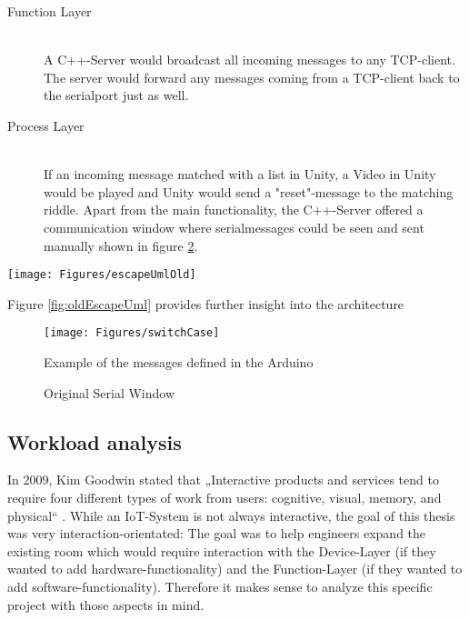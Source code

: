 \begin{description}
	\item[Function Layer]\hfill \\
        A C++-Server would broadcast all incoming messages to any TCP-client.    
        The server would forward any messages coming from a TCP-client back to the serialport just as well.
	\item[Process Layer]\hfill \\
	If an incoming message matched with a list in Unity, a Video in Unity would be played and Unity would send a "reset"-message to the matching riddle. 
	Apart from the main functionality, the C++-Server offered a communication window where serialmessages 
    could be seen and sent manually shown in figure \ref{fig:c++window}.

\end{description}

    \begin{sidewaysfigure}
        \centering
        \texttt{[image: Figures/escapeUmlOld]}
        \caption{The old escape room architecture}
        \label{fig:oldEscapeUml}
    \end{sidewaysfigure}

Figure \ref{fig:oldEscapeUml} provides further insight into the architecture

\begin{figure}[th]
    \centering
    \texttt{[image: Figures/switchCase]}
    \decoRule
    \caption[messages]{Example of the messages defined in the Arduino}
    \label{fig:switchCase}
\end{figure}

\begin{figure}[th]
    \decoRule
    \caption[messages]{Original Serial Window}
    \label{fig:c++window}
\end{figure}

\subsection{Workload analysis}
In 2009, Kim Goodwin stated that 
„Interactive products and services tend to require four different types of work from users: 
cognitive, visual, memory, and physical“ \parencite{designDigitalAge}. 
While an IoT-System is not always interactive, the goal of this thesis was very interaction-orientated: 
The goal was to help engineers expand the existing room which would require 
interaction with the Device-Layer (if they wanted to add hardware-functionality) 
and the Function-Layer (if they wanted to add software-functionality).
Therefore it makes sense to analyze this specific project with those aspects in mind. 

